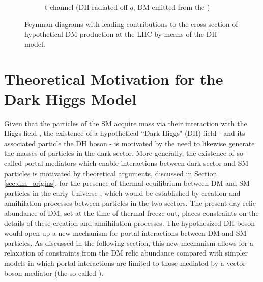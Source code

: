 \begin{figure}[hp]
\begin{subfigure}[t]{.42\textwidth}
%
%
%
%
	\caption{t-channel (DH radiated off \(q\), DM emitted from the \Zprime)}
	\label{fig:dh_tchannel}
	\end{subfigure}
	\caption{Feynman diagrams with leading contributions to the cross section of hypothetical DM production at the LHC by means of the DH model.}
	\label{fig:Feynman_DH}
\end{figure}


\section{Theoretical Motivation for the Dark Higgs Model}

Given that the particles of the SM acquire mass via their interaction with the Higgs field \cite{HiggsTheory1,HiggsTheory2,HiggsTheory3}, the existence of a hypothetical ``Dark Higgs" (DH) field - and its associated particle the DH boson - is motivated by the need to likewise generate the masses of particles in the dark sector. More generally, the existence of so-called portal mediators which enable interactions between dark sector and SM particles is motivated by theoretical arguments, discussed in Section \ref{sec:dm_origins}, for the presence of thermal equilibrium between DM and SM particles in the early Universe \cite{DM_earlyUniverse}, which would be established by creation and annihilation processes between particles in the two sectors. The present-day relic abundance of DM, set at the time of thermal freeze-out, places constraints on the details of these creation and annihilation processes. The hypothesized DH boson would open up a new mechanism for portal interactions between DM and SM particles. As discussed in the following section, this new mechanism allows for a relaxation of constraints from the DM relic abundance compared with simpler models in which portal interactions are limited to those mediated by a vector boson mediator (the so-called \Zprime). 


